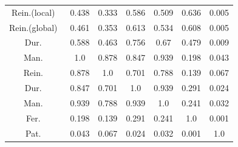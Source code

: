 \begin{table}[ht]
{\begin{tabular}{c|c c c c c c}
Rein.(local)~\cite{reinhard2002photographic} &0.438 &0.333 &0.586 &0.509 &0.636 &0.005 \\ 
Rein.(global)~\cite{reinhard2002photographic}  &0.461 &0.353 &0.613 &0.534 &0.608 &0.005 \\ 
Dur.~\cite{durand2002fast}  &0.588 &0.463 &0.756 &0.67 &0.479 &0.009 \\ 
Man.~\cite{mantiuk2006perceptual} &1.0 &0.878 &0.847 &0.939 &0.198 &0.043 \\ 
Rein.~\cite{reinhard2005dynamic}  &0.878 &1.0 &0.701 &0.788 &0.139 &0.067 \\ 
Dur.~\cite{durand2002fast}  &0.847 &0.701 &1.0 &0.939 &0.291 &0.024 \\ 
Man.~\cite{mantiuk2008display} &0.939 &0.788 &0.939 &1.0 &0.241 &0.032 \\ 
Fer.~\cite{ferradans2011analysis}  &0.198 &0.139 &0.291 &0.241 &1.0 &0.001 \\ 
Pat.~\cite{pattanaik2000time}  &0.043 &0.067 &0.024 &0.032 &0.001 &1.0 \\ 
\end{tabular}}
\end{table}


